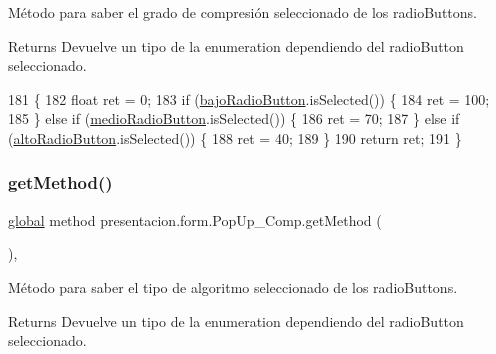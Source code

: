 Método para saber el grado de compresión seleccionado de los radio\+Button\textquotesingle{}s. 

\begin{DoxyReturn}{Returns}
Devuelve un tipo de la enumeration dependiendo del radio\+Button seleccionado. 
\end{DoxyReturn}

\begin{DoxyCode}
181                        \{
182         \textcolor{keywordtype}{float} ret = 0;
183         \textcolor{keywordflow}{if} (\hyperlink{classpresentacion_1_1form_1_1PopUp__Comp_add9532658d448dcbfa9b7dd40ddc8b38}{bajoRadioButton}.isSelected()) \{
184             ret = 100;
185         \} \textcolor{keywordflow}{else} \textcolor{keywordflow}{if} (\hyperlink{classpresentacion_1_1form_1_1PopUp__Comp_ad1daa09264648f37642b24a698e32206}{medioRadioButton}.isSelected()) \{
186             ret = 70;
187         \} \textcolor{keywordflow}{else} \textcolor{keywordflow}{if} (\hyperlink{classpresentacion_1_1form_1_1PopUp__Comp_a9f49f4c6ce6d4f60a7015d8699aef151}{altoRadioButton}.isSelected()) \{
188             ret = 40;
189         \}
190         \textcolor{keywordflow}{return} ret;
191     \}
\end{DoxyCode}
\mbox{\label{classpresentacion_1_1form_1_1PopUp__Comp_ab63511cd207f6a9f6e4f8b52f0b66523}} 
\subsubsection{\texorpdfstring{get\+Method()}{getMethod()}}
{\footnotesize\ttfamily \hyperlink{classglobal_1_1global}{global} method presentacion.\+form.\+Pop\+Up\+\_\+\+Comp.\+get\+Method (\begin{DoxyParamCaption}{ }\end{DoxyParamCaption})\hspace{0.3cm}{\ttfamily [inline]}, {\ttfamily [package]}}



Método para saber el tipo de algoritmo seleccionado de los radio\+Button\textquotesingle{}s. 

\begin{DoxyReturn}{Returns}
Devuelve un tipo de la enumeration dependiendo del radio\+Button seleccionado. 
\end{DoxyReturn}

